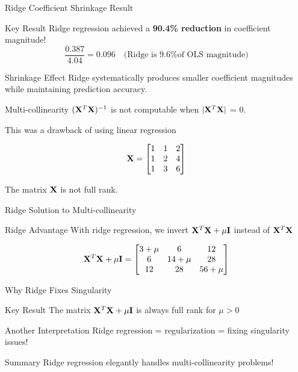 \documentclass{beamer}
\begin{document}
\begin{frame}{Ridge Coefficient Shrinkage Result}
\begin{alertbox}{Key Result}
Ridge regression achieved a {\bf 90.4\% reduction} in coefficient magnitude!
$$\frac{0.387}{4.04} = 0.096 \quad \text{(Ridge is 9.6\% of OLS magnitude)}$$
\end{alertbox}

\begin{keypointsbox}{Shrinkage Effect}
Ridge systematically produces smaller coefficient magnitudes while maintaining prediction accuracy.
\end{keypointsbox}
\end{frame}

\begin{frame}{Multi-collinearity}
$(\mathbf{X}^{T}\mathbf{X})^{-1}$ is not computable when $|\mathbf{X}^{T}\mathbf{X}|$ = 0.

This was a drawback of using linear regression

\begin{equation*}
\mathbf{X} = \begin{bmatrix}
1 & 1& 2\\
1 & 2& 4\\
1 & 3& 6\\
\end{bmatrix}
\end{equation*}

The matrix $\mathbf{X}$ is not full rank. 
\end{frame}

\begin{frame}{Ridge Solution to Multi-collinearity}
\begin{keypointsbox}{Ridge Advantage}
With ridge regression, we invert $\mathbf{X}^{T}\mathbf{X} + \mu \mathbf{I}$ instead of $\mathbf{X}^{T}\mathbf{X}$
\end{keypointsbox}

\begin{equation*}
\mathbf{X}^T\mathbf{X} + \mu \mathbf{I} = \begin{bmatrix}
3+\mu & 6& 12\\
6 & 14+\mu & 28\\
12 & 28& 56+\mu \\
\end{bmatrix}
\end{equation*}
\end{frame}

\begin{frame}{Why Ridge Fixes Singularity}
\begin{theorembox}{Key Result}
The matrix $\mathbf{X}^T\mathbf{X} + \mu \mathbf{I}$ is always full rank for $\mu > 0$
\end{theorembox}
\pause

\begin{alertbox}{Another Interpretation}
Ridge regression = regularization = fixing singularity issues!
\end{alertbox}
\pause

\begin{keypointsbox}{Summary}
Ridge regression elegantly handles multi-collinearity problems!
\end{keypointsbox}
\end{frame}
\end{document}
